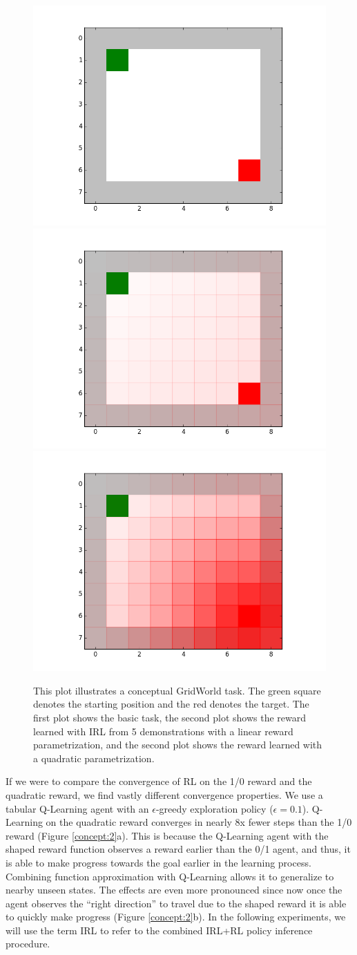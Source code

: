 \begin{figure}[ht]
\centering
 \includegraphics[width=0.32\columnwidth]{concept/swirl1-rewards.png}
  \includegraphics[width=0.32\columnwidth]{concept/swirl1-linear.png}
   \includegraphics[width=0.32\columnwidth]{concept/swirl1-quadratic.png}
 \caption{This plot illustrates a conceptual GridWorld task. The green square denotes the starting position and the red denotes the target. The first plot shows the basic task, the second plot shows the reward learned with IRL from 5 demonstrations with a linear reward parametrization, and the second plot shows the reward learned with a quadratic parametrization. \label{concept:1}}
\end{figure}

If we were to compare the convergence of RL on the 1/0 reward and the quadratic reward, we find vastly different convergence properties.
We use a tabular Q-Learning agent with an $\epsilon$-greedy exploration policy ($\epsilon=0.1$).
Q-Learning on the quadratic reward converges in nearly 8x fewer steps than the 1/0 reward (Figure \ref{concept:2}a).
This is because the Q-Learning agent with the shaped reward function observes a reward earlier than the 0/1 agent, and thus, it is able to make progress towards the goal earlier in the learning process.
Combining function approximation with Q-Learning allows it to generalize to nearby unseen states.
The effects are even more pronounced since now once the agent observes the ``right direction'' to travel due to the shaped reward it is able to quickly make progress (Figure \ref{concept:2}b).
In the following experiments, we will use the term \textsf{IRL} to refer to the combined IRL+RL policy inference procedure.

